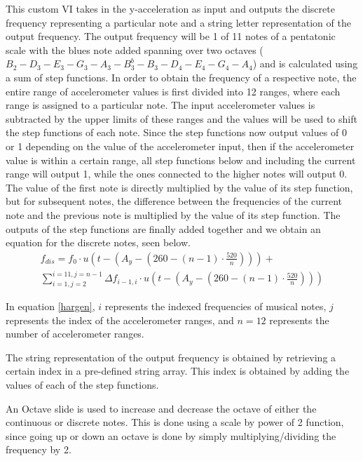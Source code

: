 This custom VI takes in the y-acceleration as input and outputs the discrete frequency representing a particular note and a string letter representation of the output frequency.
 The output frequency will be 1 of 11 notes of a pentatonic scale with the blues note added spanning over two octaves (\(B_{2} - D_{3} - E_{3} - G_{3} - A_{3} - B^{b}_{3} - B_{3} - D_{4} - E_{4} - G_{4} - A_{4}\)) and is calculated using a sum of step functions.
 In order to obtain the frequency of a respective note, the entire range of accelerometer values is first divided into 12 ranges, where each range is assigned to a particular note.
 The input accelerometer values is subtracted by the upper limits of these ranges and the values will be used to shift the step functions of each note.
 Since the step functions now output values of 0 or 1 depending on the value of the accelerometer input, then if the accelerometer value is within a certain range, all step functions below and including the current range will output 1, while the ones connected to the higher notes will output 0.
 The value of the first note is directly multiplied by the value of its step function, but for subsequent notes, the difference between the frequencies of the current note and the previous note is multiplied by the value of its step function.
 The outputs of the step functions are finally added together and we obtain an equation for the discrete notes, seen below.
\begin{equation}
\label{hargen}
\begin{split}
 f_{dis}=f_{0}\cdot u \left( t- \left( A_{y}- \left( 260- \left( n-1  \right) \cdot \frac{520}{n} \right) \right) \right) +\\ \sum_{i=1, j=2}^{i=11,j=n-1}\Delta f_{i-1,i} \cdot u\left (t-\left (A_{y}-\left (260- \left( n-1  \right) \cdot \frac{520}{n}  \right) \right) \right)
\end{split}
\end{equation}

In equation \ref{hargen}, $i$ represents the indexed frequencies of musical notes, $j$ represents the index of the accelerometer ranges, and $n = 12$ represents the number of accelerometer ranges.

The string representation of the output frequency is obtained by retrieving a certain index in a pre-defined string array.
 This index is obtained by adding the values of each of the step functions.

An Octave slide is used to increase and decrease the octave of either the continuous or discrete notes.
 This is done using a scale by power of 2 function, since going up or down an octave is done by simply multiplying/dividing the frequency by 2.

